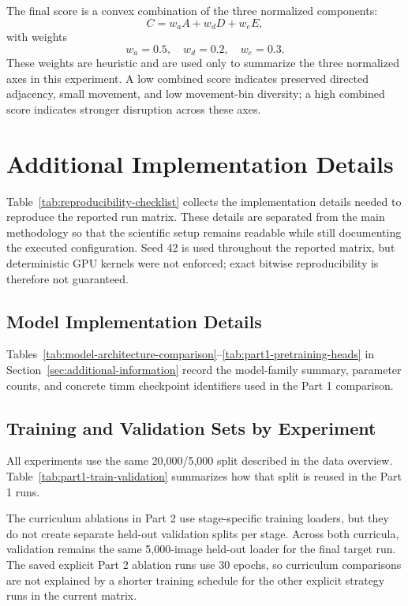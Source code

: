 \documentclass[12pt]{article}
\begin{document}
The final score is a convex combination of the three normalized components:
\[
C = w_a A + w_d D + w_e E,
\]
with weights
\[
w_a = 0.5,\quad w_d = 0.2,\quad w_e = 0.3.
\]
These weights are heuristic and are used only to summarize the three normalized axes in this experiment. A low combined score indicates preserved directed adjacency, small movement, and low movement-bin diversity; a high combined score indicates stronger disruption across these axes.

\section{Additional Implementation Details}
\label{sec:additional-implementation-details}

Table~\ref{tab:reproducibility-checklist} collects the implementation details needed to reproduce the reported run matrix. These details are separated from the main methodology so that the scientific setup remains readable while still documenting the executed configuration. Seed 42 is used throughout the reported matrix, but deterministic GPU kernels were not enforced; exact bitwise reproducibility is therefore not guaranteed.

\subsection{Model Implementation Details}

Tables~\ref{tab:model-architecture-comparison}--\ref{tab:part1-pretraining-heads} in Section~\ref{sec:additional-information} record the model-family summary, parameter counts, and concrete timm checkpoint identifiers used in the Part 1 comparison.

\subsection{Training and Validation Sets by Experiment}

All experiments use the same 20,000/5,000 split described in the data overview. Table~\ref{tab:part1-train-validation} summarizes how that split is reused in the Part 1 runs.

The curriculum ablations in Part 2 use stage-specific training loaders, but they do not create separate held-out validation splits per stage. Across both curricula, validation remains the same 5,000-image held-out loader for the final target run. The saved explicit Part 2 ablation runs use 30 epochs, so curriculum comparisons are not explained by a shorter training schedule for the other explicit strategy runs in the current matrix.
\end{document}
